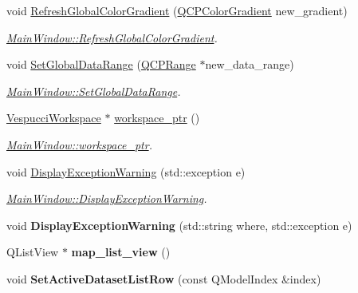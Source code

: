 \begin{DoxyCompactItemize}
void \hyperlink{class_main_window_a004bb70b988b902f0e1618bdb2695960}{Refresh\+Global\+Color\+Gradient} (\hyperlink{class_q_c_p_color_gradient}{Q\+C\+P\+Color\+Gradient} new\+\_\+gradient)
\begin{DoxyCompactList}\small\item\em \hyperlink{class_main_window_a004bb70b988b902f0e1618bdb2695960}{Main\+Window\+::\+Refresh\+Global\+Color\+Gradient}. \end{DoxyCompactList}\item 
void \hyperlink{class_main_window_aa0c431f17d5790a5bfc0e49e429c173b}{Set\+Global\+Data\+Range} (\hyperlink{class_q_c_p_range}{Q\+C\+P\+Range} $\ast$new\+\_\+data\+\_\+range)
\begin{DoxyCompactList}\small\item\em \hyperlink{class_main_window_aa0c431f17d5790a5bfc0e49e429c173b}{Main\+Window\+::\+Set\+Global\+Data\+Range}. \end{DoxyCompactList}\item 
\hyperlink{class_vespucci_workspace}{Vespucci\+Workspace} $\ast$ \hyperlink{class_main_window_af78d7dca13e15077306eb27737edb096}{workspace\+\_\+ptr} ()
\begin{DoxyCompactList}\small\item\em \hyperlink{class_main_window_af78d7dca13e15077306eb27737edb096}{Main\+Window\+::workspace\+\_\+ptr}. \end{DoxyCompactList}\item 
void \hyperlink{class_main_window_afe21228ed02306f34b6194cefeeb7feb}{Display\+Exception\+Warning} (std\+::exception e)
\begin{DoxyCompactList}\small\item\em \hyperlink{class_main_window_afe21228ed02306f34b6194cefeeb7feb}{Main\+Window\+::\+Display\+Exception\+Warning}. \end{DoxyCompactList}\item 
void {\bfseries Display\+Exception\+Warning} (std\+::string where, std\+::exception e)\hypertarget{class_main_window_ac54e339c117ef8fd2a9918506ecabdf6}{}\label{class_main_window_ac54e339c117ef8fd2a9918506ecabdf6}

\item 
Q\+List\+View $\ast$ {\bfseries map\+\_\+list\+\_\+view} ()\hypertarget{class_main_window_a7a13630a02a40927bfb218078c586f9f}{}\label{class_main_window_a7a13630a02a40927bfb218078c586f9f}

\item 
void {\bfseries Set\+Active\+Dataset\+List\+Row} (const Q\+Model\+Index \&index)\hypertarget{class_main_window_aaff45e93ab2426094d707707d2f84b18}{}\label{class_main_window_aaff45e93ab2426094d707707d2f84b18}


\end{DoxyCompactItemize}

